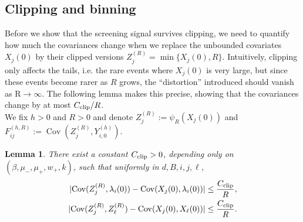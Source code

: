 \documentclass{article}
\newtheorem{lemma}{Lemma}[section]
\newcommand{\Cov}{\operatorname{Cov}}
\newcommand{\abs}[1]{\lvert #1\rvert}
\begin{document}
\subsection{Clipping and binning}
\label{appendix:2}
Before we show that the screening signal survives clipping, we need to quantify how much the covariances change when we replace the unbounded covariates $X_j(0)$ by their clipped versions $Z_j^{(R)} = \min\{X_j(0), R\}$. Intuitively, clipping only affects the tails, i.e. the rare events where $X_j(0)$ is very large, but since these events become rarer as $R$ grows, the ``distortion'' introduced should vanish as R$\to \infty$. The following lemma makes this precise, showing that the covariances change by at most $C_{\rm clip}/R$.\\
We fix $h>0$ and $R>0$ and denote $Z_j^{(R)}:=\psi_R(X_j(0))$ and $F_{ij}^{(h,R)}:=\Cov(Z_j^{(R)},Y_{i,0}^{(h)})$.
\begin{lemma}
\label{lem:clip-bias}
There exist a constant $C_{\rm clip}>0$, depending only on $(\beta,\mu_-,\mu_+,w_+,k)$, such that uniformly in $d,B,i,j,\ell$,
\begin{align}
\label{eq:clip-cov1}
\abs{\Cov(Z_j^{(R)},\lambda_i(0)) - \Cov(X_j(0),\lambda_i(0))}
&\le \frac{C_{\rm clip}}{R},\\
\label{eq:clip-cov2}
\abs{\Cov(Z_j^{(R)},Z_\ell^{(R)}) - \Cov(X_j(0),X_\ell(0))}
&\le \frac{C_{\rm clip}}{R}.
\end{align}
\end{lemma}
\end{document}
